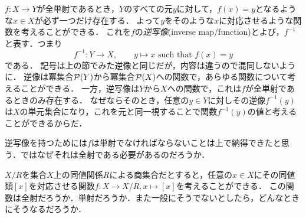 \documentclass[dvipdfmx, 11pt,a4paper]{jsarticle}
\begin{document}
$f:X \to Y$が全単射であるとき，$Y$のすべての元$y$に対して，$f(x)=y$となるような$x \in X$が必ず一つだけ存在する．
よって$y$をそのような$x$に対応させるような関数を考えることができる．
これを$f$の\emph{逆写像}(inverse map/function)とよび，$f^{-1}$と表す．つまり
\[
 f^{-1}:Y \to X, \hspace{2em} y \mapsto x \text{ such that } f(x)=y
\]
である．
記号は上の節でみた逆像と同じだが，内容は違うので混同しないように．
逆像は冪集合$\mathcal{P}(Y)$から冪集合$\mathcal{P}(X)$への関数で，あらゆる関数について考えることができる．
一方，逆写像は$Y$から$X$への関数で，これは$f$が全単射であるときのみ存在する．
なぜならそのとき，任意の$y \in Y$に対しその逆像$f^{-1}(y)$は$X$の単元集合になり，これを元と同一視することで関数$f^{-1}(y)$の値と考えることができるからだ．

\begin{renshu}{}{}
 逆写像を持つためには$f$は単射でなければならないことは上で納得できたと思う．ではなぜそれは全射である必要があるのだろうか．
\end{renshu}

\begin{renshu}{}{}
$X/R$を集合$X$上の同値関係$R$による商集合だとすると，任意の$x \in X$にその同値類$[x]$を対応させる関数$f:X \to X/R, x \mapsto [x]$を考えることができる．
この関数は全射だろうか．単射だろうか．また一般にそうでないとしたら，どんなときにそうなるだろうか．
\end{renshu}



\end{document}
